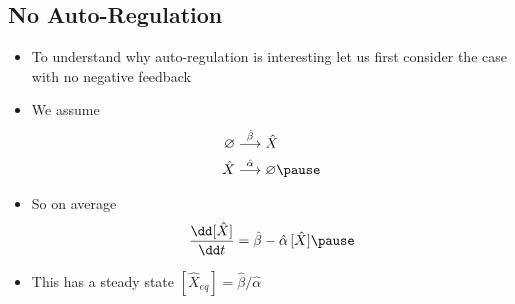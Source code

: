 \begin{slide}
\section[-1]{No Auto-Regulation}

\begin{PauseHighLight}
  \begin{itemize}
  \item To understand why auto-regulation is interesting let us first
    consider the case with no negative feedback\pause
  \item We assume
    \vspace*{-2cm}
    \begin{align*}
      \varnothing &\stackrel{\hat{\beta}}{\longrightarrow} \hat{X} \\
      \hat{X} &\stackrel{\hat{\alpha}}{\longrightarrow} \varnothing\pause
    \end{align*}
  \item So on average
    \vspace*{-1cm}
    \begin{align*}
      \frac{\dd [\hat{X}]}{\dd t} = \hat{\beta} - \hat{\alpha}\, [\hat{X}]\pause
    \end{align*}
  \item This has a steady state $[\hat{X}_{eq}] = \hat{\beta}/\hat{\alpha}$\pause
  \end{itemize}
\end{PauseHighLight}

\end{slide}


